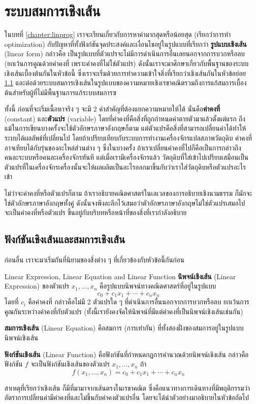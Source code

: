 \newpage
\section{ระบบสมการเชิงเส้น}\label{section:linear}
ในบทที่ \ref{chapter:linprog} เราจะเรียนเกี่ยวกับการหาค่ามากสุดหรือน้อยสุด (เรียกว่าการทำ optimization) กับปัญหาที่ทั้งฟังก์ชันจุดประสงค์และเงื่อนไขอยู่ในรูปแบบที่เรียกว่า \textbf{รูปแบบเชิงเส้น} (linear form) กล่าวคือ เป็นรูปแบบที่ตัวแปรจะไม่มีการดำเนินการอื่นเลยนอกจากการบวกหรือลบ (ยกเว้นการคูณด้วยค่าคงที่ เพราะค่าคงที่ไม่ใช่ตัวแปร) ดังนั้นเราจะมาศึกษาเกี่ยวกับพื้นฐานของระบบเชิงเส้นเบื้องต้นกันในหัวข้อนี้ ซึ่งเราจะเริ่มด้วยการทำความเข้าใจสิ่งที่เรียกว่าเชิงเส้นกันในหัวข้อย่อย \ref{subsection:linear} และต่อด้วยระบบสมการเชิงเส้นในรูปแบบของความหมายเชิงเรขาคณิตรวมถึงการแก้สมการเบื้องต้นสำหรับผู้ที่ไม่มีพื้นฐานการแก้ระบบสมการฃ

ทั้งนี้ ก่อนที่จะเริ่มเนื้อหาจริง ๆ จะมี 2 คำสำคัญที่ต้องแยกความหมายให้ได้ นั่นคือ\textbf{ค่าคงที่} (constant) และ\textbf{ตัวแปร} (variable) โดยที่ค่าคงที่คือสิ่งที่ถูกกำหนดค่าตายตัวมาแล้วตั้งแต่แรก ถึงแม้ในการเขียนบางครั้งจะใช้ตัวอักษรภาษาอังกฤษก็ตาม แต่ตัวแปรคือสิ่งที่สามารถเปลี่ยนค่าได้ทำให้ระบบได้ผลลัพธ์ที่เปลี่ยนไป โดยถ้าเปรียบเทียบกับระบบการทำงานเครื่องจักรแปลสภาพวัตถุดิบ ค่าคงที่อาจเทียบได้กับรุ่นของอะไหล่ส่วนต่าง ๆ ซึ่งในบางครั้ง ถ้าเราเปลี่ยนค่าคงที่ไปก็คือเป็นการกล่าวถึงคนละระบบหรือคนละเครื่องจักรทันที แต่เมื่อเรามีเครื่องจักรแล้ว วัตถุดิบที่ใส่เข้าไปเปรียบเสมือนเป็นตัวแปรที่ในเครื่องจักรเครื่องนั้นจะให้ผลผลิตเป็นอะไรออกมาขึ้นกับว่าเราใส่วัตถุดิบหรือตัวแปรอะไรเข้า

ไม่ว่าจะค่าคงที่หรือตัวแปรก็ตาม ถ้าเราอธิบายคณิตศาสตร์ในเลเวลของการอธิบายเชิงนามธรรม ก็มักจะใช่ตัวอักษรภาษาอังกฤษทั้งคู่ ดังนั้นจงพึงละลึกไว้เสมอว่าตัวอักษรภาษาอังกฤษไม่ใช่ตัวแปรเสมอไป จะเป็นค่าคงที่หรือตัวแปร ขึ้นอยู่กับบริบทหรือหน้าที่ของสิ่งที่เรากำลังอธิบาย

\subsection{ฟังก์ชันเชิงเส้นและสมการเชิงเส้น} \label{subsection:linear}
ก่อนอื่น เราจะมาเริ่มกันที่นิยามของสิ่งต่าง ๆ ที่เกี่ยวข้องกับหัวข้อนี้กันก่อน
\begin{definition}{Linear Expression, Linear Equation and Linear Function}{}
    \textbf{นิพจน์เชิงเส้น} (Linear Expression) ของตัวแปร $x_1, \dots, x_n$ คือรูปแบบนิพจน์ทางคณิตศาสตร์ที่อยู่ในรูปแบบ $$c_0 + c_1x_1 + \cdots + c_nx_n$$ โดยที่ $c_i$ คือค่าคงที่ กล่าวคือไม่มี 2 ตัวแปรใด ๆ ที่ดำเนินการอื่นนอกจากการบวกหรือลบ ยกเว้นการคูณกันระหว่างค่าคงที่กับตัวแปร (ทั้งนี้เรายังคงจัดให้นิพจน์ที่มีแต่ค่าคงที่เป็นนิพจน์เชิงเส้นเช่นกัน)

    \textbf{สมการเชิงเส้น} (Linear Equation) คือสมการ (การเท่ากัน) ที่ทั้งสองฝั่งของสมการอยู่ในรูปแบบนิพจน์เชิงเส้น

    \textbf{ฟังก์ชันเชิงเส้น} (Linear Function) คือฟังก์ชันที่กำหนดกฏการคำนวณด้วยนิพจน์เชิงเส้น กล่าวคือ ฟังก์ชัน $f$ จะเป็นฟังก์ชันเชิงเส้นของตัวแปร $x_1, \dots, x_n$ ถ้า
    $$
    f(x_1, \dots, x_n) = c_0 + c_1x_1 + \cdots + c_nx_n
    $$
\end{definition}
สาเหตุที่เรียกว่าเชิงเส้น ก็มีที่มามาจากเส้นตรงในเรขาคณิต ซึ่งคือแนวทางการเดินทางที่มีพฤติกรรมว่าอัตราการเปลี่ยนค่ามีค่าคงที่และไม่ขึ้นกับค่าคงตัวแปรอื่น โดยจะได้นำตัวอย่างมาอธิบายในหัวข้อถัดไป
\newpage
